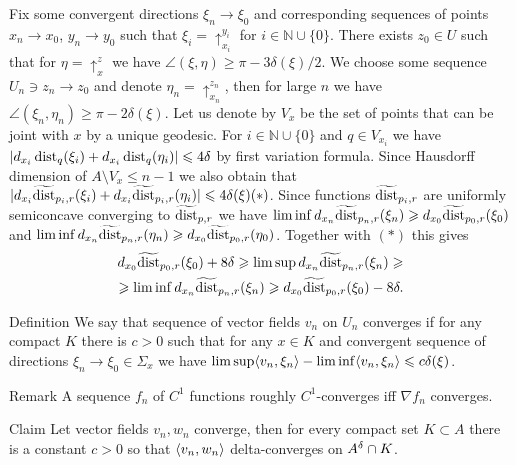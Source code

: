 Fix some convergent directions $\xi_n\to\xi_0$ and
corresponding sequences of points
$x_n\to x_0$, $y_n\to y_0$
such that  $\xi_i=\uparrow_{x_i}^{y_i}$ for $i\in\mathbb N\cup\{0\}$.
There exists $z_0 \in U$ such that for $\eta=\uparrow_x^z$ 
we have
$\angle(\xi,\eta)\ge \pi-3\delta(\xi)/2$.
We choose some sequence 
$U_n\ni z_n\to z_0$
and denote
$\eta_n=\uparrow_{x_n}^{z_n}$,
then for large $n$ we have $\angle(\xi_n,\eta_n)\ge \pi-2\delta(\xi)$.
Let us denote by $V_x$ be the set of points that can be joint with $x$
by a unique geodesic. For $i\in\mathbb N\cup\{0\}$ and
$q\in V_{x_i}$ we have $|d_{x_i} \operatorname{\rm dist}_q(\xi_i)+d_{x_i} \operatorname{\rm dist}_q(\eta_i)|\leqslant 4\delta$ by first
variation formula.
Since Hausdorff dimension of $A\setminus V_x\le n-1$ we also obtain
that
$|d_{x_i} \widetilde{\operatorname{\rm dist}}_{p_i,r}(\xi_i)+d_{x_i} \widetilde{\operatorname{\rm dist}}_{p_i,r}(\eta_i)|\leqslant 4\delta(\xi) (*)$.
Since functions
$\widetilde{\operatorname{\rm dist}}_{p_i,r}$ are uniformly semiconcave converging to
$\widetilde{\operatorname{\rm dist}}_{p,r}$ we have
$\liminf d_{x_n}\widetilde{\operatorname{\rm dist}}_{p_n,r}(\xi_n)\geqslant d_{x_0}\widetilde{\operatorname{\rm dist}}_{p_0,r}(\xi_0)$ and $\liminf d_{x_n}\widetilde{\operatorname{\rm dist}}_{p_n,r}(\eta_n)\geqslant d_{x_0}\widetilde{\operatorname{\rm dist}}_{p_0,r}(\eta_0)$.
Together with $(*)$ this gives
\begin{align*}
 d_{x_0}\widetilde{\operatorname{\rm dist}}_{p_0,r}(\xi_0)+8\delta\geqslant
\limsup d_{x_n}\widetilde{\operatorname{\rm dist}}_{p_n,r}(\xi_n)\geqslant\\
\geqslant
\liminf d_{x_n}\widetilde{\operatorname{\rm dist}}_{p_n,r}(\xi_n)\geqslant d_{x_0}\widetilde{\operatorname{\rm dist}}_{p_0,r}(\xi_0)-8\delta.
\end{align*}

\begin{thm}{Definition}
We say that sequence of vector fields $v_n$ on $U_n$
converges if for any compact $K$ there is $c>0$ such that
for any $x\in K$ and convergent sequence of directions $\xi_n\to\xi_0\in \Sigma_x$ we have
$\limsup \langle v_n,\xi_n\rangle-\liminf \langle v_n,\xi_n\rangle\leqslant c\delta(\xi)$.

\end{thm}

\begin{thm}{Remark}
A sequence $f_n$ of $C^1$ functions roughly $C^1$-converges
iff $\nabla f_n$ converges.

\end{thm}


\begin{thm}{Claim}\label{lem:scalprod}
Let vector fields $v_n, w_n$ converge, then for every compact
set $K\subset A$ there is a constant $c>0$ so that
$\langle v_n, w_n\rangle$ delta-converges on $A^\delta\cap K$.
\end{thm}

